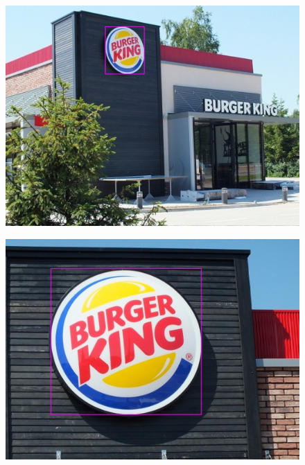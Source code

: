 \begin{figure}[H]
    \centering
    \includegraphics[width=\columnwidth]{figures/results/bk7.jpg}
    \label{fig:result7}
\end{figure}

\begin{figure}[H]
    \centering
    \includegraphics[width=\columnwidth]{figures/results/bk8.jpg}
    \label{fig:result8}
\end{figure}

